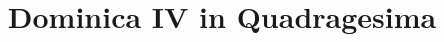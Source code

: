 \documentclass[17pt]{extarticle}
\begin{document}
\title{Dominica IV in Quadragesima}
\makereadingtitle

\end{document}
